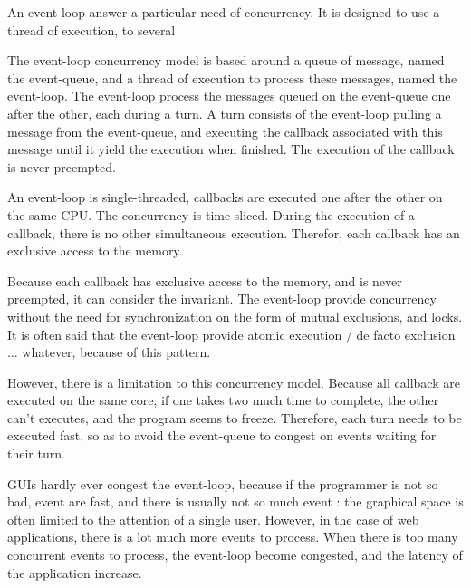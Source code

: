 

An event-loop answer a particular need of concurrency.
It is designed to use a thread of execution, to several 

The event-loop concurrency model is based around a queue of message, named the event-queue, and a thread of execution to process these messages, named the event-loop.
The event-loop process the messages queued on the event-queue one after the other, each during a turn.
A turn consists of the event-loop pulling a message from the event-queue, and executing the callback associated with this message until it yield the execution when finished.
The execution of the callback is never preempted.

An event-loop is single-threaded, callbacks are executed one after the other on the same CPU.
The concurrency is time-sliced.
During the execution of a callback, there is no other simultaneous execution.
Therefor, each callback has an exclusive access to the memory.

Because each callback has exclusive access to the memory, and is never preempted, it can consider the invariant.
The event-loop provide concurrency without the need for synchronization on the form of mutual exclusions, and locks.
It is often said that the event-loop provide atomic execution / de facto exclusion ... whatever, because of this pattern.

However, there is a limitation to this concurrency model.
Because all callback are executed on the same core, if one takes two much time to complete, the other can't executes, and the program seems to freeze.
Therefore, each turn needs to be executed fast, so as to avoid the event-queue to congest on events waiting for their turn.

GUIs hardly ever congest the event-loop, because if the programmer is not so bad, event are fast, and there is usually not so much event : the graphical space is often limited to the attention of a single user.
However, in the case of web applications, there is a lot much more events to process.
When there is too many concurrent events to process, the event-loop become congested, and the latency of the application increase.

